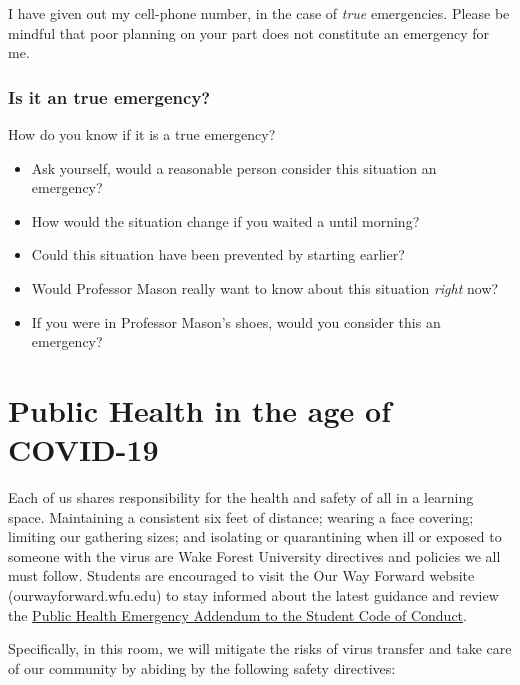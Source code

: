 \documentclass[11pt,]{article}
\providecommand{\tightlist}{%
  \setlength{\itemsep}{0pt}\setlength{\parskip}{0pt}}
\begin{document}
I have given out my cell-phone number, in the case of \emph{true}
emergencies. Please be mindful that poor planning on your part does not
constitute an emergency for me.

\hypertarget{is-it-an-true-emergency}{%
\subsubsection{Is it an true emergency?}\label{is-it-an-true-emergency}}

How do you know if it is a true emergency?

\begin{itemize}
\tightlist
\item
  Ask yourself, would a reasonable person consider this situation an
  emergency?
\item
  How would the situation change if you waited a until morning?
\item
  Could this situation have been prevented by starting earlier?
\item
  Would Professor Mason really want to know about this situation
  \emph{right} now?
\item
  If you were in Professor Mason's shoes, would you consider this an
  emergency?
\end{itemize}

\hypertarget{public-health-in-the-age-of-covid-19}{%
\section{Public Health in the age of
COVID-19}\label{public-health-in-the-age-of-covid-19}}

Each of us shares responsibility for the health and safety of all in a
learning space. Maintaining a consistent six feet of distance; wearing a
face covering; limiting our gathering sizes; and isolating or
quarantining when ill or exposed to someone with the virus are Wake
Forest University directives and policies we all must follow. Students
are encouraged to visit the Our Way Forward website
(ourwayforward.wfu.edu) to stay informed about the latest guidance and
review the
\href{https://studentconduct.wfu.edu/undergraduate-student-handbook/minimum_expectations/public-health-emergency-addendum/}{Public
Health Emergency Addendum to the Student Code of Conduct}.

Specifically, in this room, we will mitigate the risks of virus transfer
and take care of our community by abiding by the following safety
directives:
\end{document}
